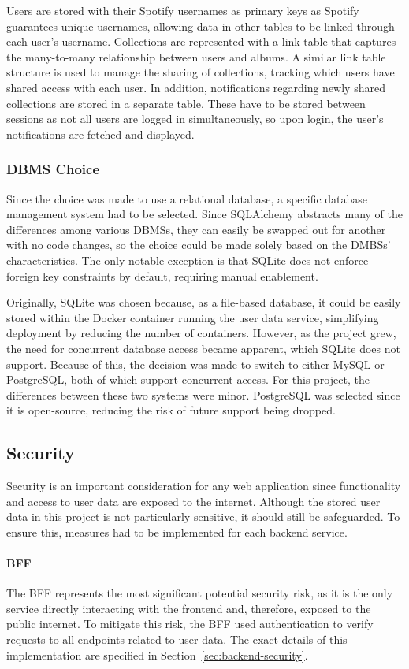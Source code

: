 Users are stored with their Spotify usernames as primary keys as Spotify guarantees unique usernames, allowing data in other tables to be linked through each user's username. Collections are represented with a link table that captures the many-to-many relationship between users and albums. A similar link table structure is used to manage the sharing of collections, tracking which users have shared access with each user. In addition, notifications regarding newly shared collections are stored in a separate table. These have to be stored between sessions as not all users are logged in simultaneously, so upon login, the user's notifications are fetched and displayed.

\subsubsection{DBMS Choice}
Since the choice was made to use a relational database, a specific database management system had to be selected. Since SQLAlchemy abstracts many of the differences among various DBMSs, they can easily be swapped out for another with no code changes, so the choice could be made solely based on the DMBSs' characteristics. The only notable exception is that SQLite does not enforce foreign key constraints by default, requiring manual enablement.

Originally, SQLite was chosen because, as a file-based database, it could be easily stored within the Docker container running the user data service, simplifying deployment by reducing the number of containers. However, as the project grew, the need for concurrent database access became apparent, which SQLite does not support. Because of this, the decision was made to switch to either MySQL or PostgreSQL, both of which support concurrent access. For this project, the differences between these two systems were minor. PostgreSQL was selected since it is open-source, reducing the risk of future support being dropped.

\subsection{Security}
Security is an important consideration for any web application since functionality and access to user data are exposed to the internet. Although the stored user data in this project is not particularly sensitive, it should still be safeguarded. To ensure this, measures had to be implemented for each backend service.

\paragraph{BFF} The BFF represents the most significant potential security risk, as it is the only service directly interacting with the frontend and, therefore, exposed to the public internet. To mitigate this risk, the BFF used authentication to verify requests to all endpoints related to user data. The exact details of this implementation are specified in Section~\ref{sec:backend-security}.

